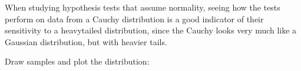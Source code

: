 \documentclass[letterpaper,10pt,english]{sphinxmanual}
\begin{document}
\begin{fulllineitems}
When studying hypothesis tests that assume normality, seeing how the
tests perform on data from a Cauchy distribution is a good indicator of
their sensitivity to a heavy\sphinxhyphen{}tailed distribution, since the Cauchy looks
very much like a Gaussian distribution, but with heavier tails.

Draw samples and plot the distribution:

\begin{sphinxVerbatim}[commandchars=\\\{\}]
   
  
  \PYG{p}{[}  \PYG{p}{]}  
 
\end{sphinxVerbatim}

\end{fulllineitems}

\end{document}
